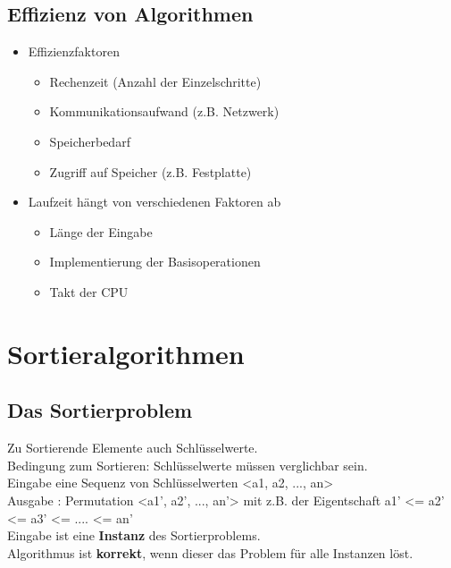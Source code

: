 \documentclass[jou,apacite]{apa6}
\begin{document}
\subsection{Effizienz von Algorithmen}
\begin{itemize}
    \item Effizienzfaktoren 
    \begin{itemize}
        \item Rechenzeit (Anzahl der Einzelschritte)
        \item Kommunikationsaufwand (z.B. Netzwerk)
        \item Speicherbedarf
        \item Zugriff auf Speicher (z.B. Festplatte)
    \end{itemize}
    
    \item Laufzeit hängt von verschiedenen Faktoren ab
    \begin{itemize}
        \item Länge der Eingabe
        \item Implementierung der Basisoperationen
        \item Takt der CPU
    \end{itemize}

\end{itemize}
    
\section{Sortieralgorithmen}

\subsection{Das Sortierproblem}
Zu Sortierende Elemente auch Schlüsselwerte. \\
Bedingung zum Sortieren: Schlüsselwerte müssen verglichbar sein. \\
Eingabe eine Sequenz von Schlüsselwerten <a1, a2, ..., an> \\
Ausgabe : Permutation <a1', a2’, ..., an’> mit z.B. der Eigentschaft a1’ <= a2’ <= a3’ <= .... <= an’ \\
Eingabe ist eine {\bfseries Instanz} des Sortierproblems. \\
Algorithmus ist {\bfseries korrekt}, wenn dieser das Problem für alle Instanzen löst.
\end{document}
